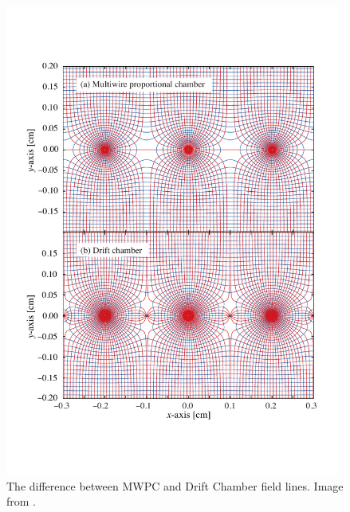 \begin{figure}[htbp]
\begin{center}
	\includegraphics[width=110mm]{Chapter1/figures/mwpcLines.pdf}
	\caption{The difference between MWPC and Drift Chamber field lines. Image from \cite{radiationLengthsBook}.}
	\label{fig:fieldLinesDriftChamber}
\end{center}
\end{figure}

